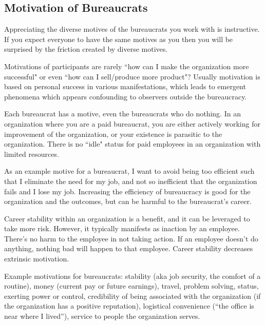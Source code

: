 \subsection{Motivation of Bureaucrats\label{sec:motivations}}

Appreciating the diverse motives of the bureaucrats you work with is instructive. If you expect everyone to have the same motives as you then you will be surprised by the friction created by diverse motives. 

Motivations of participants are rarely ``how can I make the organization more successful" or even ``how can I sell/produce more product"? Usually motivation is based on personal success in various manifestations, which leads to emergent phenomena which appears confounding to observers outside the bureaucracy. 



Each bureaucrat has a motive, even the bureaucrats who do nothing. 
In an organization where you are a paid bureaucrat, you are either actively working for improvement of the organization, or your existence is parasitic to the organization. There is no ``idle" status for paid employees in an organization with limited resources.

As an example motive for a bureaucrat, I want to avoid being too efficient such that I eliminate the need for my job, and not so inefficient that the organization fails and I lose my job. Increasing the efficiency of bureaucracy is good for the organization and the outcomes, but can be harmful to the bureaucrat's career.

Career stability within an organization is a benefit, and it can be leveraged to take more risk. However, it typically manifests as inaction by an employee. There's no harm to the employee in not taking action. If an employee doesn't do anything, nothing bad will happen to that employee. Career stability decreases extrinsic motivation.


Example motivations for bureaucrats: 
stability (aka job security, the comfort of a routine),
money (current pay or future earnings), 
travel, 
problem solving, 
status, 
exerting power or control, 
credibility of being associated with the organization (if the organization has a positive reputation), 
logistical convenience (``the office is near where I lived''), 
service to people the organization serves.



